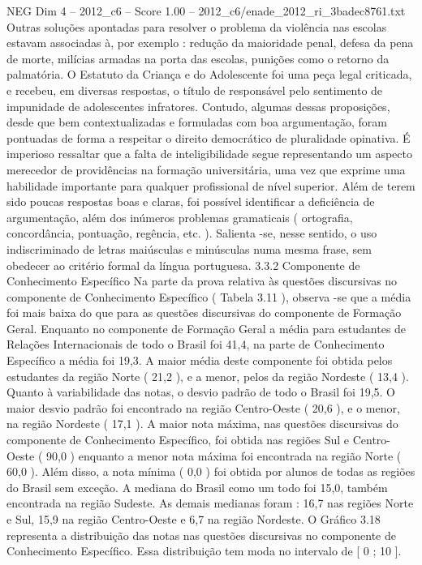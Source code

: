 \begin{textsample}{NEG Dim 4 – 2012\_c6 – Score 1.00 – 2012\_c6/enade\_2012\_ri\_3badec8761.txt}
Outras soluções apontadas para resolver o problema da violência nas escolas estavam associadas à, por exemplo : redução da maioridade penal, defesa da pena de morte, milícias armadas na porta das escolas, punições como o retorno da palmatória.
O Estatuto da Criança e do Adolescente foi uma peça legal criticada, e recebeu, em diversas respostas, o título de responsável pelo sentimento de impunidade de adolescentes infratores.
Contudo, algumas dessas proposições, desde que bem contextualizadas e formuladas com boa argumentação, foram pontuadas de forma a respeitar o direito democrático de pluralidade opinativa.
É imperioso ressaltar que a falta de inteligibilidade segue representando um aspecto merecedor de providências na formação universitária, uma vez que exprime uma habilidade importante para qualquer profissional de nível superior.
Além de terem sido poucas respostas boas e claras, foi possível identificar a deficiência de argumentação, além dos inúmeros problemas gramaticais ( ortografia, concordância, pontuação, regência, etc. ).
Salienta -se, nesse sentido, o uso indiscriminado de letras maiúsculas e minúsculas numa mesma frase, sem obedecer ao critério formal da língua portuguesa. 3.3.2 Componente de Conhecimento Específico Na parte da prova relativa às questões discursivas no componente de Conhecimento Específico ( Tabela 3.11 ), observa -se que a média foi mais baixa do que para as questões discursivas do componente de Formação Geral.
Enquanto no componente de Formação Geral a média para estudantes de Relações Internacionais de todo o Brasil foi 41,4, na parte de Conhecimento Específico a média foi 19,3.
A maior média deste componente foi obtida pelos estudantes da região Norte ( 21,2 ), e a menor, pelos da região Nordeste ( 13,4 ).
Quanto à variabilidade das notas, o desvio padrão de todo o Brasil foi 19,5.
O maior desvio padrão foi encontrado na região Centro-Oeste ( 20,6 ), e o menor, na região Nordeste ( 17,1 ).
A maior nota máxima, nas questões discursivas do componente de Conhecimento Específico, foi obtida nas regiões Sul e Centro-Oeste ( 90,0 ) enquanto a menor nota máxima foi encontrada na região Norte ( 60,0 ).
Além disso, a nota mínima ( 0,0 ) foi obtida por alunos de todas as regiões do Brasil sem exceção.
A mediana do Brasil como um todo foi 15,0, também encontrada na região Sudeste.
As demais medianas foram : 16,7 nas regiões Norte e Sul, 15,9 na região Centro-Oeste e 6,7 na região Nordeste.
O Gráfico 3.18 representa a distribuição das notas nas questões discursivas no componente de Conhecimento Específico.
Essa distribuição tem moda no intervalo de [ 0 ; 10 ].

\end{textsample}
